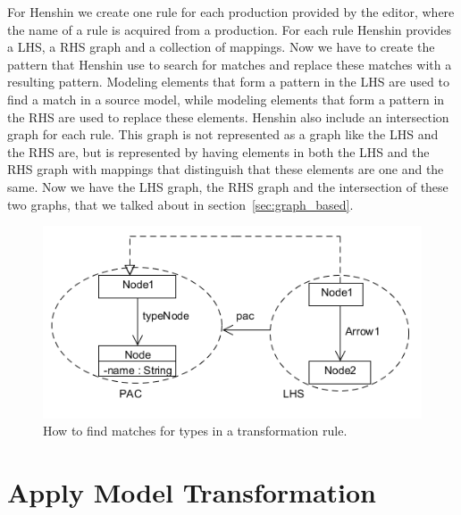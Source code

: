 For Henshin we create one rule for each production provided by the editor, where
the name of a rule is acquired from a production. For each rule Henshin provides
a LHS, a RHS graph and a collection of mappings. Now we have to create the
pattern that Henshin use to search for matches and replace these matches with a
resulting pattern. Modeling elements that form a pattern in the LHS are used to
find a match in a source model, while modeling elements that form a pattern in
the RHS are used to replace these elements. Henshin also include an intersection
graph for each rule. This graph is not represented as a graph like the LHS and
the RHS are, but is represented by having elements in both the LHS and the RHS
graph with mappings that distinguish that these elements are one and the same.
Now we have the LHS graph, the RHS graph and the intersection of these two
graphs, that we talked about in section~\ref{sec:graph_based}. 

\begin{figure}[H] 
	\centering
	\includegraphics[scale=0.7]{./Figures/PAC_Henshin_node.png}
	\caption[How to handle node types for a rule]
	{How to find matches for types in a transformation rule.}
	\label{fig:pac_henshin}
\end{figure}

\section{Apply Model Transformation}




